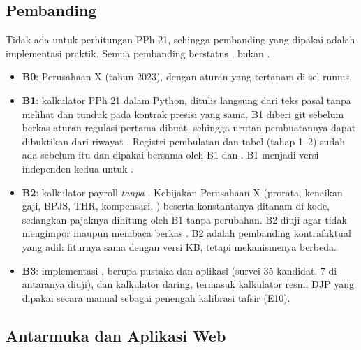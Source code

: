 \subsection{ Pembanding}
\label{subsec:baseline}

Tidak ada  untuk perhitungan PPh 21, sehingga pembanding yang dipakai adalah implementasi praktik. Semua pembanding berstatus , bukan .
\begin{itemize}[leftmargin=*,nosep]
  \item \textbf{B0}:  Perusahaan X (tahun 2023), dengan aturan yang tertanam di sel rumus.
  \item \textbf{B1}: kalkulator PPh 21  dalam Python, ditulis langsung dari teks pasal tanpa melihat  dan tunduk pada kontrak presisi yang sama. B1 diberi  git sebelum berkas aturan regulasi pertama dibuat, sehingga urutan pembuatannya dapat dibuktikan dari riwayat . Registri pembulatan dan  tabel (tahap 1--2) sudah ada sebelum  itu dan dipakai bersama oleh B1 dan . B1 menjadi versi independen kedua untuk .
  \item \textbf{B2}: kalkulator payroll \emph{tanpa} . Kebijakan Perusahaan X (prorata, kenaikan gaji, BPJS, THR, kompensasi, ) beserta konstantanya ditanam di kode, sedangkan pajaknya dihitung oleh B1 tanpa perubahan. B2 diuji agar tidak mengimpor  maupun membaca berkas . B2 adalah pembanding kontrafaktual yang adil: fiturnya sama dengan versi KB, tetapi mekanismenya berbeda.
  \item \textbf{B3}: implementasi , berupa pustaka dan aplikasi (survei 35 kandidat, 7 di antaranya diuji), dan kalkulator daring, termasuk kalkulator resmi DJP yang dipakai secara manual sebagai penengah kalibrasi tafsir (E10).
\end{itemize}

\subsection{Antarmuka dan Aplikasi Web}
\label{subsec:web}

